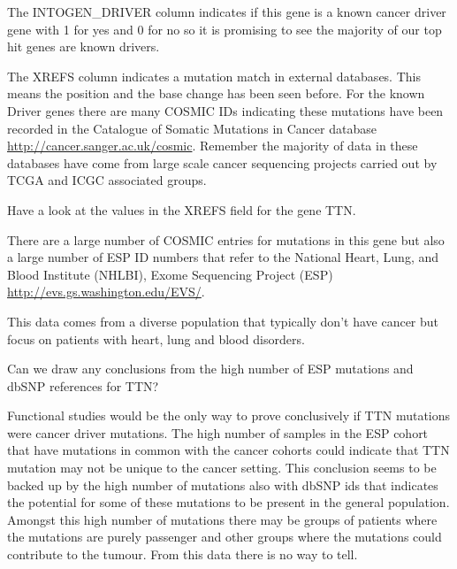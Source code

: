 \begin{information}
The INTOGEN\_DRIVER column indicates if this gene is a known cancer driver gene with 1 for yes and
0 for no so it is promising to see the majority of our top hit genes are known drivers.

The XREFS column indicates a mutation match in external databases. This means the position and
the base change has been seen before. For the known Driver genes there are many COSMIC IDs indicating
these mutations have been recorded in the Catalogue of Somatic Mutations in Cancer database
\url{http://cancer.sanger.ac.uk/cosmic}. Remember the majority of data in these databases have come from
large scale cancer sequencing projects carried out by TCGA and ICGC associated groups.
\end{information}

\begin{steps}
Have a look at the values in the XREFS field for the gene TTN.
\end{steps}

There are a large number of COSMIC entries for mutations in this gene but also a large number
of ESP ID numbers that refer to the National Heart, Lung, and Blood Institute (NHLBI),
Exome Sequencing Project (ESP) \url{http://evs.gs.washington.edu/EVS/}.

\begin{information}
This data comes from a diverse population that typically don't have cancer but focus on patients
with heart, lung and blood disorders.
\end{information}

\begin{questions}
Can we draw any conclusions from the high number of ESP mutations and dbSNP references for TTN?
\end{questions}

\begin{answer}
Functional studies would be the only way to prove conclusively if TTN mutations were cancer driver mutations.
The high number of samples in the ESP cohort that have mutations in common with the cancer cohorts
could indicate that TTN mutation may not be unique to the cancer setting. This conclusion seems to be
backed up by the high number of mutations also with dbSNP ids that indicates the potential for some of
these mutations to be present in the general population.
\vspace{4 mm}
Amongst this high number of mutations there may be groups of patients where the mutations are purely
passenger and other groups where the mutations could contribute to the tumour.
\vspace{4 mm}
From this data there is no way to tell.
\end{answer}

